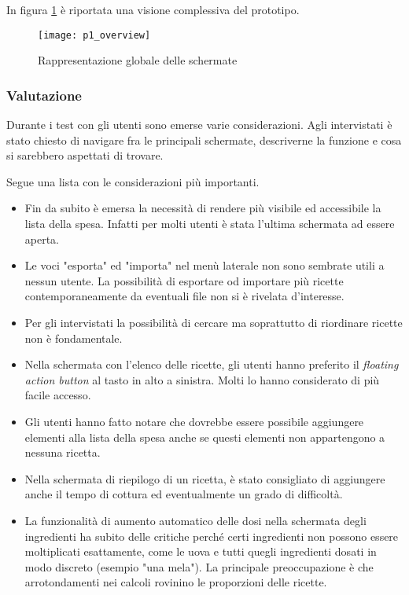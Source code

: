 \clearpage
In figura \ref{fig:p1_overview} è riportata una visione complessiva del prototipo.

\begin{figure}[ht]
  \begin{center}
    \texttt{[image: p1\_overview]}
    \caption{Rappresentazione globale delle schermate}
    \label{fig:p1_overview}
  \end{center}
\end{figure}

\subsubsection{Valutazione}
Durante i test con gli utenti sono emerse varie considerazioni.
Agli intervistati è stato chiesto di navigare fra le principali schermate, descriverne la funzione e cosa si sarebbero aspettati di trovare.

Segue una lista con le considerazioni più importanti.
\begin{itemize}
  \item Fin da subito è emersa la necessità di rendere più visibile ed accessibile la lista della spesa.
    Infatti per molti utenti è stata l'ultima schermata ad essere aperta.

  \item Le voci "esporta" ed "importa" nel menù laterale non sono sembrate utili a nessun utente.
    La possibilità di esportare od importare più ricette contemporaneamente da eventuali file non si è rivelata d'interesse.

  \item Per gli intervistati la possibilità di cercare ma soprattutto di riordinare ricette non è fondamentale.

\item Nella schermata con l'elenco delle ricette, gli utenti hanno preferito il \textit{floating action button} al tasto in alto a sinistra.
  Molti lo hanno considerato di più facile accesso.

  \item Gli utenti hanno fatto notare che dovrebbe essere possibile aggiungere elementi alla lista della spesa anche se questi elementi non appartengono a nessuna ricetta.

  \item Nella schermata di riepilogo di un ricetta, è stato consigliato di aggiungere anche il tempo di cottura ed eventualmente un grado di difficoltà.

  \item La funzionalità di aumento automatico delle dosi nella schermata degli ingredienti ha subito delle critiche perché certi ingredienti non possono essere moltiplicati esattamente, come le uova e tutti quegli ingredienti dosati in modo discreto (esempio "una mela").
    La principale preoccupazione è che arrotondamenti nei calcoli rovinino le proporzioni delle ricette.
\end{itemize}


